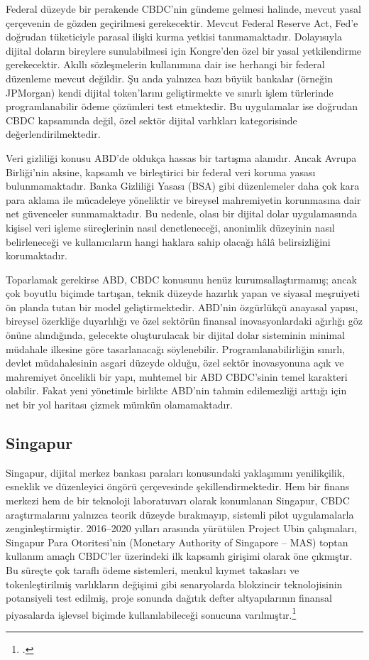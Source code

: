 \documentclass[a4paper,12pt]{article}
\begin{document}
Federal düzeyde bir perakende CBDC’nin gündeme gelmesi halinde, mevcut yasal çerçevenin de gözden geçirilmesi gerekecektir. Mevcut Federal Reserve Act, Fed’e doğrudan tüketiciyle parasal ilişki kurma yetkisi tanımamaktadır. Dolayısıyla dijital doların bireylere sunulabilmesi için Kongre’den özel bir yasal yetkilendirme gerekecektir. Akıllı sözleşmelerin kullanımına dair ise herhangi bir federal düzenleme mevcut değildir. Şu anda yalnızca bazı büyük bankalar (örneğin JPMorgan) kendi dijital token’larını geliştirmekte ve sınırlı işlem türlerinde programlanabilir ödeme çözümleri test etmektedir. Bu uygulamalar ise doğrudan CBDC kapsamında değil, özel sektör dijital varlıkları kategorisinde değerlendirilmektedir.

Veri gizliliği konusu ABD’de oldukça hassas bir tartışma alanıdır. Ancak Avrupa Birliği’nin aksine, kapsamlı ve birleştirici bir federal veri koruma yasası bulunmamaktadır. Banka Gizliliği Yasası (BSA) gibi düzenlemeler daha çok kara para aklama ile mücadeleye yöneliktir ve bireysel mahremiyetin korunmasına dair net güvenceler sunmamaktadır. Bu nedenle, olası bir dijital dolar uygulamasında kişisel veri işleme süreçlerinin nasıl denetleneceği, anonimlik düzeyinin nasıl belirleneceği ve kullanıcıların hangi haklara sahip olacağı hâlâ belirsizliğini korumaktadır.

Toparlamak gerekirse ABD, CBDC konusunu henüz kurumsallaştırmamış; ancak çok boyutlu biçimde tartışan, teknik düzeyde hazırlık yapan ve siyasal meşruiyeti ön planda tutan bir model geliştirmektedir. ABD’nin özgürlükçü anayasal yapısı, bireysel özerkliğe duyarlılığı ve özel sektörün finansal inovasyonlardaki ağırlığı göz önüne alındığında, gelecekte oluşturulacak bir dijital dolar sisteminin minimal müdahale ilkesine göre tasarlanacağı söylenebilir. Programlanabilirliğin sınırlı, devlet müdahalesinin asgari düzeyde olduğu, özel sektör inovasyonuna açık ve mahremiyet öncelikli bir yapı, muhtemel bir ABD CBDC'sinin temel karakteri olabilir. Fakat yeni yönetimle birlikte ABD'nin tahmin edilemezliği arttığı için net bir yol haritası çizmek mümkün olamamaktadır.


\subsection{Singapur}

Singapur, dijital merkez bankası paraları konusundaki yaklaşımını yenilikçilik, esneklik ve düzenleyici öngörü çerçevesinde şekillendirmektedir. Hem bir finans merkezi hem de bir teknoloji laboratuvarı olarak konumlanan Singapur, CBDC araştırmalarını yalnızca teorik düzeyde bırakmayıp, sistemli pilot uygulamalarla zenginleştirmiştir. 2016–2020 yılları arasında yürütülen Project Ubin çalışmaları, Singapur Para Otoritesi’nin (Monetary Authority of Singapore – MAS) toptan kullanım amaçlı CBDC’ler üzerindeki ilk kapsamlı girişimi olarak öne çıkmıştır. Bu süreçte çok taraflı ödeme sistemleri, menkul kıymet takasları ve tokenleştirilmiş varlıkların değişimi gibi senaryolarda blokzincir teknolojisinin potansiyeli test edilmiş, proje sonunda dağıtık defter altyapılarının finansal piyasalarda işlevsel biçimde kullanılabileceği sonucuna varılmıştır.\footcite{mas2020ubin}
\end{document}
